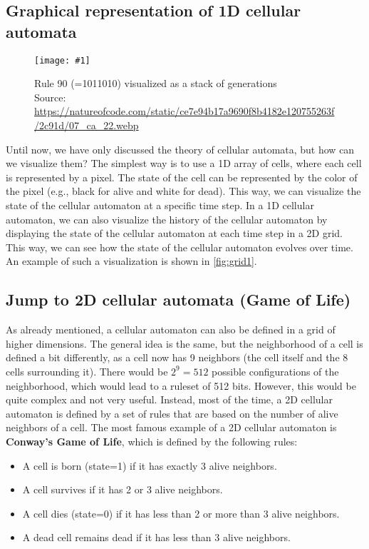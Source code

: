 \documentclass[a4paper,12pt]{llncs}
\numberwithin{equation}{section}
\newcommand{\imagewithwidth}[5]{
  \begin{figure}[htbp]%
    \begin{center}%
      \texttt{[image: \#1]}%
      \caption[#5]{#4}%
      \label{#3}%
    \end{center}%
  \end{figure}
}
\begin{document}
\subsection{Graphical representation of 1D cellular automata}
\imagewithwidth{figures/rule90}{\textwidth}{fig:grid1}{Rule 90 (=1011010) visualized as a stack of generations\\Source: \url{https://natureofcode.com/static/ce7e94b17a9690f8b4182e120755263f/2c91d/07_ca_22.webp}}{}
Until now, we have only discussed the theory of cellular automata, but how can we visualize them?
The simplest way is to use a 1D array of cells, where each cell is represented by a pixel.
The state of the cell can be represented by the color of the pixel (e.g., black for alive and white for dead).
This way, we can visualize the state of the cellular automaton at a specific time step.
In a 1D cellular automaton, we can also visualize the history of the cellular automaton by displaying the state of the cellular automaton at each time step in a 2D grid.
This way, we can see how the state of the cellular automaton evolves over time.
An example of such a visualization is shown in \autoref{fig:grid1}.
\subsection{Jump to 2D cellular automata (Game of Life)}
As already mentioned, a cellular automaton can also be defined in a grid of higher dimensions.
The general idea is the same, but the neighborhood of a cell is defined a bit differently, as a cell now has 9 neighbors (the cell itself and the 8 cells surrounding it).
There would be $2^9=512$ possible configurations of the neighborhood, which would lead to a ruleset of 512 bits.
However, this would be quite complex and not very useful.
Instead, most of the time, a 2D cellular automaton is defined by a set of rules that are based on the number of alive neighbors of a cell.
The most famous example of a 2D cellular automaton is \textbf{Conway's Game of Life}, which is defined by the following rules:
\begin{itemize}
  \item A cell is born (state=1) if it has exactly 3 alive neighbors.
  \item A cell survives if it has 2 or 3 alive neighbors.
  \item A cell dies (state=0) if it has less than 2 or more than 3 alive neighbors.
  \item A dead cell remains dead if it has less than 3 alive neighbors.
\end{itemize}
\end{document}

